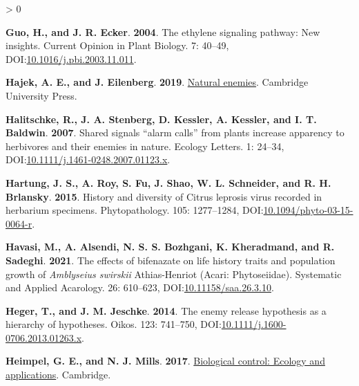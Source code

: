 \documentclass{ufdissertation}[overrideChapters] %
\newlength{\cslhangindent}
\newenvironment{CSLReferences}[2] %
 {%
  \setlength{\parindent}{0pt}
  \ifodd #1 \everypar{\setlength{\hangindent}{\cslhangindent}}\ignorespaces\fi
  \ifnum #2 > 0
  \setlength{\parskip}{#2\baselineskip}
  \fi
 }%
 {}
\begin{document}
{\begin{CSLReferences}{1}{1}
\leavevmode{}%
\textbf{Guo, H., and J. R. Ecker}. \textbf{2004}. The ethylene signaling pathway: New insights. Current Opinion in Plant Biology. 7: 40--49, DOI:\href{https://doi.org/10.1016/j.pbi.2003.11.011}{10.1016/j.pbi.2003.11.011}.

\leavevmode{}%
\textbf{Hajek, A. E., and J. Eilenberg}. \textbf{2019}. \href{https://www.ebook.de/de/product/31183605/ann_e_hajek_joergen_eilenberg_natural_enemies.html}{Natural enemies}. Cambridge University Press.

\leavevmode{}%
\textbf{Halitschke, R., J. A. Stenberg, D. Kessler, A. Kessler, and I. T. Baldwin}. \textbf{2007}. Shared signals {\textendash}{``alarm calls''} from plants increase apparency to herbivores and their enemies in nature. Ecology Letters. 1: 24--34, DOI:\href{https://doi.org/10.1111/j.1461-0248.2007.01123.x}{10.1111/j.1461-0248.2007.01123.x}.

\leavevmode{}%
\textbf{Hartung, J. S., A. Roy, S. Fu, J. Shao, W. L. Schneider, and R. H. Brlansky}. \textbf{2015}. History and diversity of {Citrus leprosis virus} recorded in herbarium specimens. Phytopathology{\textregistered}. 105: 1277--1284, DOI:\href{https://doi.org/10.1094/phyto-03-15-0064-r}{10.1094/phyto-03-15-0064-r}.

\leavevmode{}%
\textbf{Havasi, M., A. Alsendi, N. S. S. Bozhgani, K. Kheradmand, and R. Sadeghi}. \textbf{2021}. The effects of bifenazate on life history traits and population growth of {\emph{Amblyseius swirskii}} {Athias-Henriot} ({Acari}: {Phytoseiidae}). Systematic and Applied Acarology. 26: 610--623, DOI:\href{https://doi.org/10.11158/saa.26.3.10}{10.11158/saa.26.3.10}.

\leavevmode{}%
\textbf{Heger, T., and J. M. Jeschke}. \textbf{2014}. The enemy release hypothesis as a hierarchy of hypotheses. Oikos. 123: 741--750, DOI:\href{https://doi.org/10.1111/j.1600-0706.2013.01263.x}{10.1111/j.1600-0706.2013.01263.x}.

\leavevmode{}%
\textbf{Heimpel, G. E., and N. J. Mills}. \textbf{2017}. \href{https://www.ebook.de/de/product/28005981/george_e_heimpel_nicholas_j_mills_biological_control_ecology_and_applications.html}{Biological control: Ecology and applications}. Cambridge.


\end{CSLReferences}}
\end{document}
